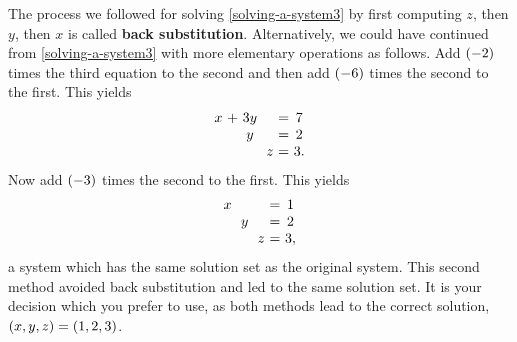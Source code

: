\begin{solution}
  The process we followed for solving \eqref{solving-a-system3} by first
  computing $z$, then $y$, then $x$ is called \textbf{back
    substitution}.  Alternatively, we could
  have continued from \eqref{solving-a-system3} with more elementary
  operations as follows. Add $\left(-2\right) $ times the third
  equation to the second and then add $\left(-6\right) $ times the
  second to the first. This yields
  \begin{equation*}
    \allowbreak
    \begin{array}{c@{~}c@{~}c@{~}c@{~}c@{~}c@{~}c}
      x&+&3y&&&=&7 \\
      &&y&&&=&2 \\
      &&&&z&=&3.
    \end{array}
  \end{equation*}
  Now add $\left(-3\right) $ times the second to the first. This yields
  \begin{equation*}
    \allowbreak
    \begin{array}{c@{~}c@{~}c@{~}c@{~}c@{~}c@{~}c}
      x&&&&&=&1 \\
      &&y&&&=&2 \\
      &&&&z&=&3,
    \end{array}
  \end{equation*}
  a system which has the same solution set as the original
  system. This second method avoided back substitution and led to the
  same solution set. It is your decision which you prefer to use, as
  both methods lead to the correct solution,
  $\left(x,y,z \right) = \left(1,2,3\right)$.
\end{solution}

